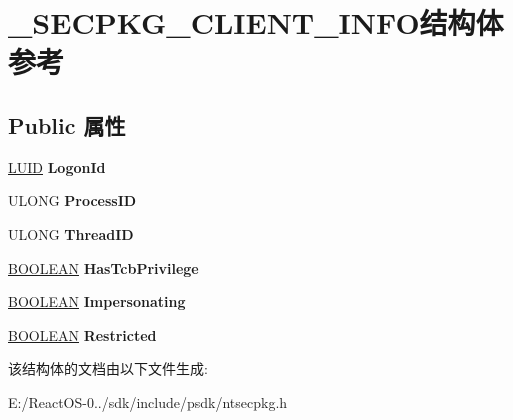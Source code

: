 \hypertarget{struct___s_e_c_p_k_g___c_l_i_e_n_t___i_n_f_o}{}\section{\+\_\+\+S\+E\+C\+P\+K\+G\+\_\+\+C\+L\+I\+E\+N\+T\+\_\+\+I\+N\+F\+O结构体 参考}
\label{struct___s_e_c_p_k_g___c_l_i_e_n_t___i_n_f_o}
\subsection*{Public 属性}
\begin{DoxyCompactItemize}
\item 
\mbox{\label{struct___s_e_c_p_k_g___c_l_i_e_n_t___i_n_f_o_a578be0b462328fa18c92c302d95f3c5d}} 
\hyperlink{struct___l_u_i_d}{L\+U\+ID} {\bfseries Logon\+Id}
\item 
\mbox{\label{struct___s_e_c_p_k_g___c_l_i_e_n_t___i_n_f_o_a6c5af30221ff17cb774fec2e0b77926d}} 
U\+L\+O\+NG {\bfseries Process\+ID}
\item 
\mbox{\label{struct___s_e_c_p_k_g___c_l_i_e_n_t___i_n_f_o_a5c130f2f416d15bf96e495814be0e4b6}} 
U\+L\+O\+NG {\bfseries Thread\+ID}
\item 
\mbox{\label{struct___s_e_c_p_k_g___c_l_i_e_n_t___i_n_f_o_a762f2acea35b5eee35a598342a6eaa1d}} 
\hyperlink{_processor_bind_8h_a112e3146cb38b6ee95e64d85842e380a}{B\+O\+O\+L\+E\+AN} {\bfseries Has\+Tcb\+Privilege}
\item 
\mbox{\label{struct___s_e_c_p_k_g___c_l_i_e_n_t___i_n_f_o_a35652f6e9a6ab3b78d13e4b35077f576}} 
\hyperlink{_processor_bind_8h_a112e3146cb38b6ee95e64d85842e380a}{B\+O\+O\+L\+E\+AN} {\bfseries Impersonating}
\item 
\mbox{\label{struct___s_e_c_p_k_g___c_l_i_e_n_t___i_n_f_o_a9bce9ba25a6d0859ec66551228275f1d}} 
\hyperlink{_processor_bind_8h_a112e3146cb38b6ee95e64d85842e380a}{B\+O\+O\+L\+E\+AN} {\bfseries Restricted}
\end{DoxyCompactItemize}


该结构体的文档由以下文件生成\+:\begin{DoxyCompactItemize}
\item 
E\+:/\+React\+O\+S-\/0../sdk/include/psdk/ntsecpkg.\+h\end{DoxyCompactItemize}
